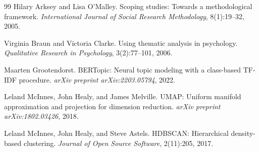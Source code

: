 \documentclass[
  11pt,
]{article}
\begin{document}
\begin{thebibliography}{99}
Hilary Arksey and Lisa O'Malley.
\newblock Scoping studies: Towards a methodological framework.
\newblock \emph{International Journal of Social Research Methodology}, 8(1):19--32, 2005.

Virginia Braun and Victoria Clarke.
\newblock Using thematic analysis in psychology.
\newblock \emph{Qualitative Research in Psychology}, 3(2):77--101, 2006.

Maarten Grootendorst.
\newblock BERTopic: Neural topic modeling with a class-based TF-IDF procedure.
\newblock \emph{arXiv preprint arXiv:2203.05794}, 2022.

Leland McInnes, John Healy, and James Melville.
\newblock UMAP: Uniform manifold approximation and projection for dimension reduction.
\newblock \emph{arXiv preprint arXiv:1802.03426}, 2018.

Leland McInnes, John Healy, and Steve Astels.
\newblock HDBSCAN: Hierarchical density-based clustering.
\newblock \emph{Journal of Open Source Software}, 2(11):205, 2017.

\end{thebibliography}
\end{document}
